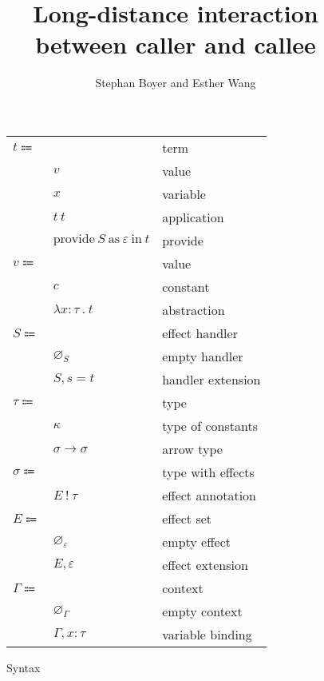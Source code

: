 \documentclass[12pt]{article}
\title{Long-distance interaction \\ between caller and callee}
\author{Stephan Boyer and Esther Wang}
\date{}
\newcommand\eterm{t}
\newcommand\evalue{v}
\newcommand\econst{c}
\newcommand\evar{x}
\newcommand\eabs[2]{\lambda #1 \ . \ #2}
\newcommand\eapp[2]{#1 \ #2}
\newcommand\eprovide[3]{\text{provide} \ #1 \ \text{as} \ #2 \ \text{in} \ #3}
\newcommand\pall{S}
\newcommand\pname{s}
\newcommand\pitem[2]{#1 = #2}
\newcommand\pempty{\varnothing_{\pall}}
\newcommand\pextend[2]{#1, #2}
\newcommand\ttype{\tau}
\newcommand\tconst{\kappa}
\newcommand\tarrow[2]{#1 \rightarrow #2}
\newcommand\tanno[2]{#1 : #2}
\newcommand\twithx{\sigma}
\newcommand\tx[2]{#1 \ ! \ #2}
\newcommand\xeffect{\varepsilon}
\newcommand\xeffects{E}
\newcommand\xempty{\varnothing_{\xeffect}}
\newcommand\xextend[2]{#1, #2}
\newcommand\ccontext{\Gamma}
\newcommand\cempty{\varnothing_{\ccontext}}
\newcommand\cextend[2]{#1, #2}
\begin{document}
  \maketitle

  \begin{figure}
    \begin{mdframed}
      \begin{center}
        \begin{tabular}{l l l}
          $\eterm \Coloneqq $ & & term \\
          & $\evalue$ & value \\
          & $\evar$ & variable \\
          & $\eapp{\eterm}{\eterm}$ & application \\
          & $\eprovide{\pall}{\xeffect}{\eterm}$ & provide \\
          $\evalue \Coloneqq $ & & value \\
          & $\econst$ & constant \\
          & $\eabs{\tanno{\evar}{\ttype}}{\eterm}$ & abstraction \\
          $\pall \Coloneqq$ & & effect handler \\
          & $\pempty$ & empty handler \\
          & $\pextend{\pall}{\pitem{\pname}{\eterm}}$ & handler extension \\
          $\ttype \Coloneqq$ & & type \\
          & $\tconst$ & type of constants \\
          & $\tarrow{\twithx}{\twithx}$ & arrow type \\
          $\twithx \Coloneqq$ & & type with effects \\
          & $\tx{\xeffects}{\ttype}$ & effect annotation \\
          $\xeffects \Coloneqq$ & & effect set \\
          & $\xempty$ & empty effect \\
          & $\xextend{\xeffects}{\xeffect}$ & effect extension \\
          $\ccontext \Coloneqq$ & & context \\
          & $\cempty$ & empty context \\
          & $\cextend{\ccontext}{\tanno{\evar}{\ttype}}$ & variable binding \\
        \end{tabular}
      \end{center}

      \caption{Syntax}
      \label{fig:syntax}
    \end{mdframed}
  \end{figure}
\end{document}
